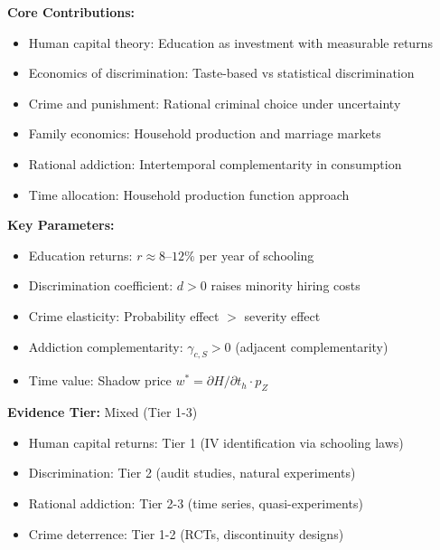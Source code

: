 \begin{tcolorbox}[colback=gray!5!white,colframe=gray!75!black,title=Quick Reference]
\textbf{Core Contributions:}
\begin{itemize}
    \item Human capital theory: Education as investment with measurable returns
    \item Economics of discrimination: Taste-based vs statistical discrimination
    \item Crime and punishment: Rational criminal choice under uncertainty
    \item Family economics: Household production and marriage markets
    \item Rational addiction: Intertemporal complementarity in consumption
    \item Time allocation: Household production function approach
\end{itemize}

\textbf{Key Parameters:}
\begin{itemize}
    \item Education returns: $r \approx 8$--$12\%$ per year of schooling
    \item Discrimination coefficient: $d > 0$ raises minority hiring costs
    \item Crime elasticity: Probability effect $> $ severity effect
    \item Addiction complementarity: $\gamma_{c,S} > 0$ (adjacent complementarity)
    \item Time value: Shadow price $w^* = \partial H/\partial t_h \cdot p_Z$
\end{itemize}

\textbf{Evidence Tier:} Mixed (Tier 1-3)
\begin{itemize}
    \item Human capital returns: Tier 1 (IV identification via schooling laws)
    \item Discrimination: Tier 2 (audit studies, natural experiments)
    \item Rational addiction: Tier 2-3 (time series, quasi-experiments)
    \item Crime deterrence: Tier 1-2 (RCTs, discontinuity designs)
\end{itemize}
\end{tcolorbox}


